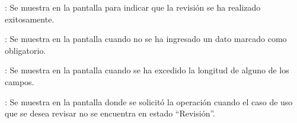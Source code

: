 \begin{description}
	
	\item {}: Se muestra en la pantalla  para indicar que la revisión se ha realizado exitosamente.
	
	\item {}: Se muestra en la pantalla  cuando no se ha ingresado un dato marcado como obligatorio.
	
	\item {}: Se muestra en la pantalla  cuando se ha excedido la longitud de alguno de los campos.
	
	\item {}: Se muestra en la pantalla donde se solicitó la operación cuando el caso de uso que se desea revisar no se encuentra en estado ``Revisión''.
	
\end{description}
